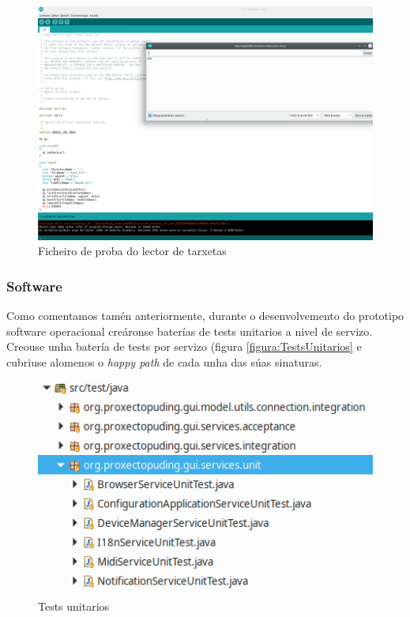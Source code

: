   \begin{figure}[htbp]
   \centering
   \includegraphics[scale=0.5,keepaspectratio=true]{./imagenes/resultado-test-lector-tarxetas.png}
   \caption{Ficheiro de proba do lector de tarxetas}
   \label{figura:ResultadoTestUnitarioLectorTarxetas}
  \end{figure}
  
  \subsubsection{Software}
  
  Como comentamos tamén anteriormente, durante o desenvolvemento do prototipo
  software operacional creáronse baterías de tests unitarios a nivel de
  servizo. \\
  
  Creouse unha batería de tests por servizo (figura \ref{figura:TestsUnitarios}
  e cubriuse alomenos o \textit{happy path} de cada unha das súas sinaturas. \\
  
  \begin{figure}[htbp]
   \centering
   \includegraphics[scale=0.8,keepaspectratio=true]{./imagenes/tests-unitarios.png}
   \caption{Tests unitarios}
   \label{figura:TestUnitarios}
  \end{figure}
  
